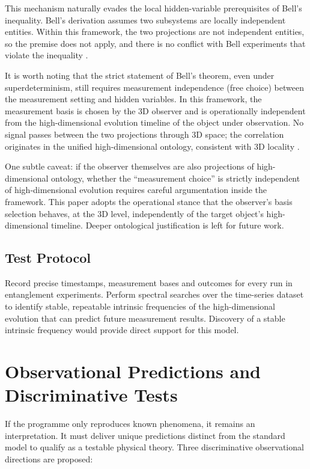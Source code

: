 \documentclass[12pt,a4paper]{article}
\begin{document}
This mechanism naturally evades the local hidden-variable prerequisites of Bell’s inequality. Bell’s derivation assumes two subsystems are locally independent entities. Within this framework, the two projections are not independent entities, so the premise does not apply, and there is no conflict with Bell experiments that violate the inequality \cite{bell1964, aspect1982}.

It is worth noting that the strict statement of Bell’s theorem, even under superdeterminism, still requires measurement independence (free choice) between the measurement setting and hidden variables. In this framework, the measurement basis is chosen by the 3D observer and is operationally independent from the high-dimensional evolution timeline of the object under observation. No signal passes between the two projections through 3D space; the correlation originates in the unified high-dimensional ontology, consistent with 3D locality \cite{brassard2000, gill2014}.

One subtle caveat: if the observer themselves are also projections of high-dimensional ontology, whether the “measurement choice” is strictly independent of high-dimensional evolution requires careful argumentation inside the framework. This paper adopts the operational stance that the observer’s basis selection behaves, at the 3D level, independently of the target object’s high-dimensional timeline. Deeper ontological justification is left for future work.

\subsection{Test Protocol}
Record precise timestamps, measurement bases and outcomes for every run in entanglement experiments. Perform spectral searches over the time-series dataset to identify stable, repeatable intrinsic frequencies of the high-dimensional evolution that can predict future measurement results. Discovery of a stable intrinsic frequency would provide direct support for this model.

\section{Observational Predictions and Discriminative Tests}
If the programme only reproduces known phenomena, it remains an interpretation. It must deliver unique predictions distinct from the standard model to qualify as a testable physical theory. Three discriminative observational directions are proposed:
\end{document}
